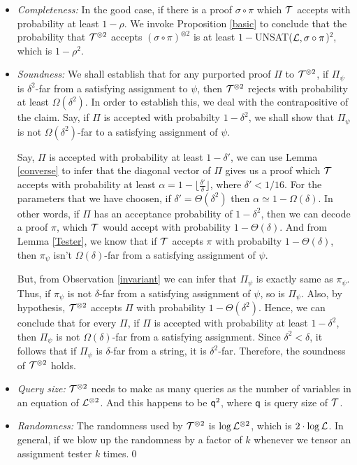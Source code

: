 \begin{itemize}
\item {\em Completeness:} In the good case, if there is a proof
  $\sigma \circ \pi$ which ${\cal T}$ accepts with probability at
  least $1 - \rho$. We invoke Proposition \ref{basic} to conclude that
  the probability that ${\cal T}^{\otimes 2}$ accepts $\left(\sigma
    \circ \pi\right)^{\otimes 2}$ is at least $1 -$UNSAT(${\cal L}, \sigma
  \circ \pi$)$^2$, which is $1 - \rho^2$.

\item {\em Soundness:} We shall establish that for any purported proof
  $\Pi$ to ${\cal T}^{\otimes 2}$, if $\Pi_\psi$ is $\delta^2$-far
  from a satisfying assignment to $\psi$, then ${\cal T}^{\otimes 2}$
  rejects with probability at least $\Omega(\delta^2)$.  In order to
  establish this, we deal with the contrapositive of the claim.  Say,
  if $\Pi$ is accepted with probabilty $1 - \delta^2$, we shall show
  that $\Pi_\psi$ is not $\Omega(\delta^2)$-far to a satisfying
  assignment of $\psi$.

  Say, $\Pi$ is accepted with probability at least $1 - \delta'$, we
  can use Lemma \ref{converse} to infer that the diagonal vector of
  ${\Pi}$ gives us a proof which ${\cal T}$ accepts with probability
  at least $\alpha = 1 - \lfloor \frac{\delta'}{\delta}\rfloor$, where
  $\delta' < 1/16$. For the parameters that we have choosen, if
  $\delta' = \Theta(\delta^2)$ then $\alpha \simeq 1 -
  \Omega(\delta)$. In other words, if $\Pi$ has an acceptance
  probability of $1 - \delta^2$, then we can decode a proof $\pi$,
  which ${\cal T}$ would accept with probability $1 -
  \Theta(\delta)$. And from Lemma \ref{Tester}, we know that if ${\cal
    T}$ accepts $\pi$ with probabilty $1 - \Theta(\delta)$, then
  $\pi_\psi$ isn't $\Omega(\delta)$-far from a satisfying assignment
  of $\psi$.

  But, from Observation \ref{invariant} we can infer that $\Pi_\psi$
  is exactly same as $\pi_\psi$. Thus, if $\pi_\psi$ is not
  $\delta$-far from a satisfying assignment of $\psi$, so is
  $\Pi_\psi$. Also, by hypothesis, ${\cal T}^{\otimes 2}$ accepts
  $\Pi$ with probability $1 - \Theta(\delta^2)$. Hence, we can
  conclude that for every $\Pi$, if $\Pi$ is accepted with probability
  at least $1 - \delta^2$, then $\Pi_\psi$ is not $\Omega(\delta)$-far
  from a satisfying assignment. Since $\delta^2 < \delta$, it follows
  that if $\Pi_\psi$ is $\delta$-far from a string, it is
  $\delta^2$-far. Therefore, the soundness of ${\cal T}^{\otimes 2}$
  holds.
\item {\em Query size:} ${\cal T}^{\otimes 2}$ needs to make as many
  queries as the number of variables in an equation of ${\cal L}^{\otimes
    2}$. And this happens to be ${\sf q}^2$, where ${\sf q}$ is query size of ${\cal T}$.

\item {\em Randomness:} The randomness used by ${\cal T}^{\otimes 2}$
  is $\log {\cal L}^{\otimes 2}$, which is $2 \cdot \log {\cal L}$. In general,
  if we blow up the randomness by a factor of $k$ whenever we tensor
  an assignment tester $k$ times.\qed
\end{itemize}


